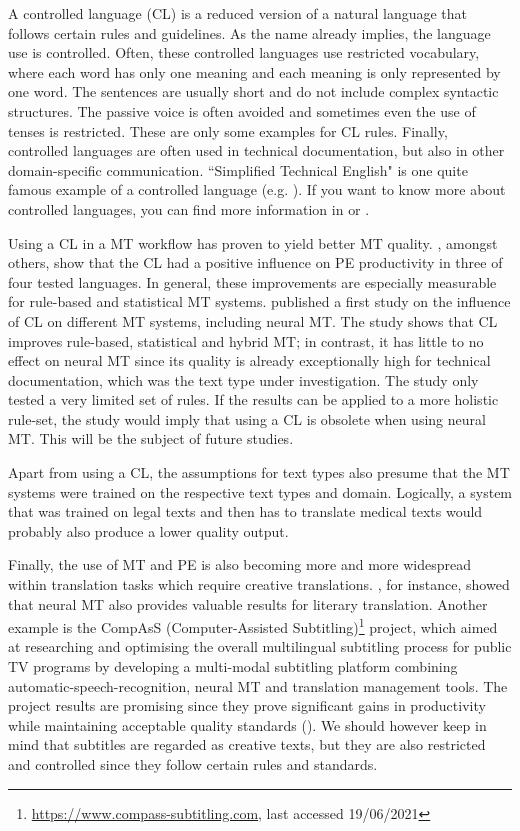 A controlled language (CL) is a reduced version of a natural language that follows certain rules and guidelines. As the name already implies, the language use is controlled. Often, these controlled languages use restricted vocabulary, where each word has only one meaning and each meaning is only represented by one word. The sentences are usually short and do not include complex syntactic structures. The passive voice is often avoided and sometimes even the use of tenses is restricted. These are only some examples for CL rules. Finally, controlled languages are often used in technical documentation, but also in other domain-specific communication. ``Simplified Technical English" is one quite famous example of a controlled language (e.g. \citealt{knezevic2015improving}). If you want to know more about controlled languages, you can find more information in \citet{kamprath1998controlled} or \citet{kittredge2003sublanguages}.

Using a CL in a MT workflow has proven to yield better MT quality. \citet{aikawa2007impact}, amongst others, show that the CL had a positive influence on PE productivity in three of four tested languages. In general, these improvements are especially measurable for rule-based and statistical MT systems. \citet{marzouk2019evaluation} published a first study on the influence of CL on different MT systems, including neural MT. The study shows that CL improves rule-based, statistical and hybrid MT; in contrast, it has little to no effect on neural MT since its quality is already exceptionally high for technical documentation, which was the text type under investigation. The study only tested a very limited set of rules. If the results can be applied to a more holistic rule-set, the study would imply that using a CL is obsolete when using neural MT. This will be the subject of future studies.

Apart from using a CL, the assumptions for text types also presume that the MT systems were trained on the respective text types and domain. Logically, a system that was trained on legal texts and then has to translate medical texts would probably also produce a lower quality output.

Finally, the use of MT and PE is also becoming more and more widespread within translation tasks which require creative translations. \citet{toral2018post}, for instance, showed that neural MT also provides valuable results for literary translation. Another example is the CompAsS (Computer-Assisted Subtitling)\footnote{\url{https://www.compass-subtitling.com}, last accessed 19/06/2021} project, which aimed at researching and optimising the overall multilingual subtitling process for public TV programs by developing a multi-modal subtitling platform combining automatic-speech-recognition, neural MT and translation management tools. The project results are promising since they prove significant gains in productivity while maintaining acceptable quality standards (\citealt{tardel2020effort}). We should however keep in mind that subtitles are regarded as creative texts, but they are also restricted and controlled since they follow certain rules and standards.

